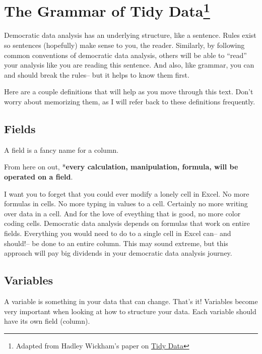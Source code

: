 \documentclass[]{book}
\begin{document}
\hypertarget{the-grammar-of-tidy-data}{%
\section[The Grammar of Tidy Data]{\texorpdfstring{The Grammar of Tidy Data\footnote{Adapted from Hadley Wickham's paper on \href{https://vita.had.co.nz/papers/tidy-data.pdf}{Tidy Data}}}{The Grammar of Tidy Data}}\label{the-grammar-of-tidy-data}}

Democratic data analysis has an underlying structure, like a sentence. Rules exist so sentences (hopefully) make sense to you, the reader. Similarly, by following common conventions of democratic data analysis, others will be able to ``read'' your analysis like you are reading this sentence. And also, like grammar, you can and should break the rules-- but it helps to know them first.

Here are a couple definitions that will help as you move through this text. Don't worry about memorizing them, as I will refer back to these definitions frequently.

\hypertarget{fields}{%
\subsection{Fields}\label{fields}}

A field is a fancy name for a column.

From here on out, *\textbf{every calculation, manipulation, formula, will be operated on a field}.

I want you to forget that you could ever modify a lonely cell in Excel. No more formulas in cells. No more typing in values to a cell. Certainly no more writing over data in a cell. And for the love of eveything that is good, no more color coding cells. Democratic data analysis depends on formulas that work on entire fields. Everything you would need to do to a single cell in Excel can-- and should!-- be done to an entire column. This may sound extreme, but this approach will pay big dividends in your democratic data analysis journey.

\hypertarget{variables}{%
\subsection{Variables}\label{variables}}

A variable is something in your data that can change. That's it! Variables become very important when looking at how to structure your data. Each variable should have its own field (column).
\end{document}
